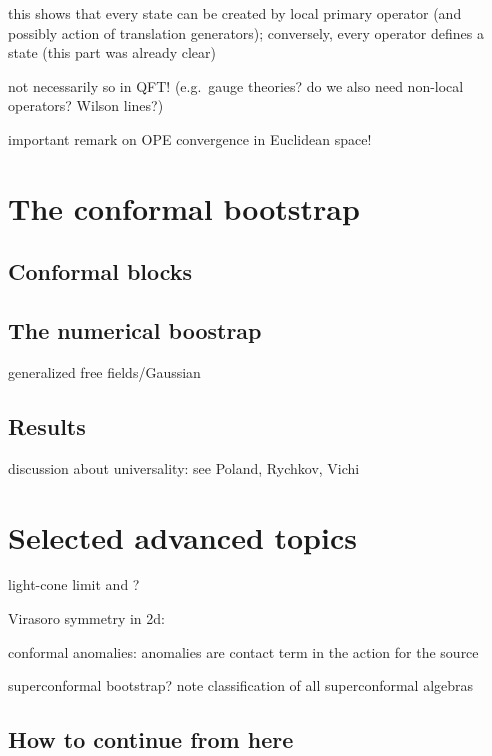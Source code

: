 \documentclass[a4paper,12pt]{article}
\numberwithin{equation}{section}
\begin{document}
this shows that every state can be created by local primary operator (and possibly action of translation generators); conversely, every operator defines a state (this part was already clear)

not necessarily so in QFT! (e.g.~gauge theories? do we also need non-local operators? Wilson lines?)





important remark on OPE convergence in Euclidean space!


\section{The conformal bootstrap}

\subsection{Conformal blocks}

\subsection{The numerical boostrap}

generalized free fields/Gaussian

\subsection{Results}


discussion about universality: see Poland, Rychkov, Vichi


\section{Selected advanced topics}

light-cone limit and ?

Virasoro symmetry in 2d:


conformal anomalies: anomalies are contact term in the action for the source


superconformal bootstrap? note classification of all superconformal algebras


\subsection{How to continue from here}
\end{document}
